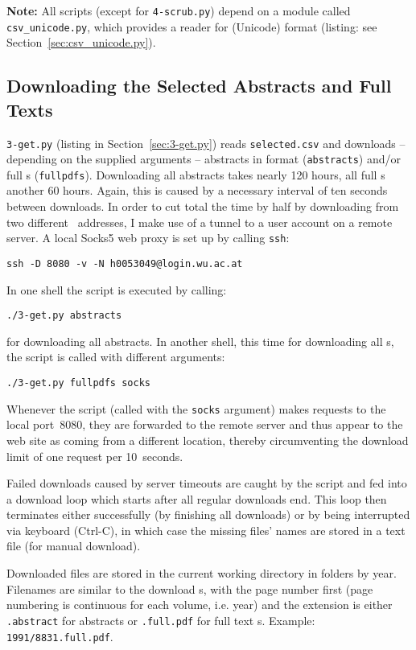 \textbf{Note:} All  scripts (except for \texttt{4-scrub.py}) depend on a module called \texttt{csv\_unicode.py}, which provides a  reader for  (Unicode) format (listing: see Section~\ref{sec:csv_unicode.py}).

\subsection{Downloading the Selected Abstracts and Full Texts}

\texttt{3-get.py} (listing in Section~\ref{sec:3-get.py}) reads \texttt{selected.csv} and downloads -- depending on the supplied arguments -- abstracts in  format (\texttt{abstracts}) and/or full s (\texttt{fullpdfs}).
Downloading all abstracts takes nearly 120 hours, all full s another 60 hours. Again, this is caused by a necessary interval of ten seconds between downloads.
In order to cut total the time by half by downloading from two different ~addresses, I make use of a  tunnel to a user account on a remote server.
A local Socks5 web proxy is set up by calling \texttt{ssh}:
\begin{verbatim}
ssh -D 8080 -v -N h0053049@login.wu.ac.at
\end{verbatim}
In one shell the script is executed by calling:
\begin{verbatim}
./3-get.py abstracts
\end{verbatim}
for downloading all abstracts. In another shell, this time for downloading all s, the script is called with different arguments:
\begin{verbatim}
./3-get.py fullpdfs socks
\end{verbatim}
Whenever the script (called with the \texttt{socks} argument) makes requests to the local port~8080, they are forwarded to the remote server and thus appear to the  web site as coming from a different location, thereby circumventing the download limit of one request per 10~seconds.

Failed downloads caused by server timeouts are caught by the script and fed into a download loop which starts after all regular downloads end. This loop then terminates either successfully (by finishing all downloads) or by being interrupted via keyboard (Ctrl-C), in which case the missing files' names are stored in a text file (for manual download).

Downloaded files are stored in the current working directory in folders by year. Filenames are similar to the download s, with the page number first (page numbering is continuous for each volume, i.e. year) and the extension is either \texttt{.abstract} for  abstracts or \texttt{.full.pdf} for full text s. Example: \texttt{1991/8831.full.pdf}.

